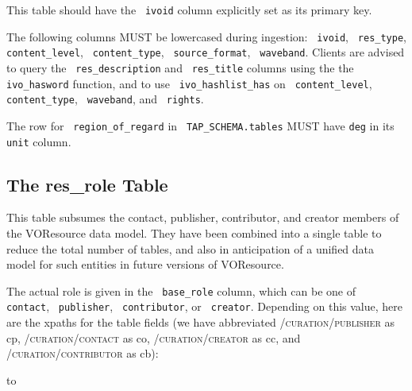 \documentclass[11pt,a4paper]{ivoa}
\newcommand{\rtent}[1]{\texttt{\color{rtcolor} #1}}
\newcommand{\tapent}[1]{\texttt{\color{tapcolor} #1}}
\newcommand{\vorent}[1]{\textsc{#1}}
\begin{document}


This table should have the \rtent{ivoid} column explicitly set
as its primary key.

The following columns MUST be lowercased during ingestion:
\rtent{ivoid}, \rtent{res\_type}, \rtent{content\_level},
\rtent{content\_type}, \rtent{source\_format},
\rtent{waveband}.
Clients are advised to query the \rtent{res\_description} and
\rtent{res\_title}  columns
using the the \rtent{ivo\_hasword} function, and to use
\rtent{ivo\_hashlist\_has} on \rtent{content\_level},
\rtent{content\_type},
\rtent{waveband}, and \rtent{rights}.

The row for \rtent{region\_of\_regard} in  
\tapent{TAP\_SCHEMA.tables} MUST have \texttt{deg} in its
\tapent{unit} column.




\subsection{The res\_role Table}

\label{table_res_role}

This table subsumes the contact, publisher, contributor, 
and creator members of the
VOResource data model.  They have been combined into a single table to
reduce the total number of tables, and also in anticipation of a unified
data model for such entities in future versions of VOResource.

The actual role is given in the \rtent{base\_role} column, which
can be one of \rtent{contact}, \rtent{publisher}, \rtent{contributor}, or
\rtent{creator}.  Depending on this value, here are the xpaths
for the table fields (we have abbreviated
\vorent{/curation/publisher}
as cp, \vorent{/curation/contact} as co, \vorent{/curation/creator} 
as cc,
and \vorent{/curation/contributor} as cb):

\vspace{5pt}
\hbox to
\vskip5pt
\end{document}
